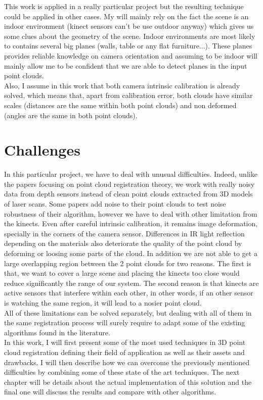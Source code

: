 This work is applied in a really particular project but the resulting technique could be applied in other cases. My will mainly rely on the fact the scene is an indoor environment (kinect sensors can't be use outdoor anyway) which gives us some clues about the geometry of the scene. Indoor environments are most likely to contains several big planes (walls, table or any flat furniture...). These planes provides reliable knowledge on camera orientation and assuming to be indoor will mainly allow me to be confident that we are able to detect planes in the input point clouds. \\
Also, I assume in this work that both camera intrinsic calibration is already solved, which means that, apart from calibration error, both clouds have similar scales (distances are the same within both point clouds) and non deformed (angles are the same in both point clouds). 

\section{Challenges}

In this particular project, we have to deal with unusual difficulties. Indeed, unlike the papers focusing on point cloud registration theory, we work with really noisy data from depth sensors instead of clean point clouds extracted from 3D models of laser scans. Some papers add noise to their point clouds to test noise robustness of their algorithm, however we have to deal with other limitation from the kinects. Even after careful intrinsic calibration, it remains image deformation, specially in the corners of the camera sensor. Differences in IR light reflection depending on the materials also deteriorate the quality of the point cloud by deforming or loosing some parts of the cloud. In addition we are not able to get a large overlapping region between the 2 point clouds for two reasons. The first is that, we want to cover a large scene and placing the kinects too close would reduce significantly the range of our system. The second reason is that kinects are active sensors that interfere within each other, in other words, if an other sensor is watching the same region, it will lead to a nosier point cloud. \\
All of these limitations can be solved separately, but dealing with all of them in the same registration process will surely require to adapt some of the existing algorithms found in the literature. \\
In this work, I will first present some of the most used techniques in 3D point cloud registration defining their field of application as well as their assets and drawbacks. I will then describe how we can overcome the previously mentioned difficulties by combining some of these state of the art techniques. The next chapter will be details about the actual implementation of this solution and the final one will discuss the results and compare with other algorithms.